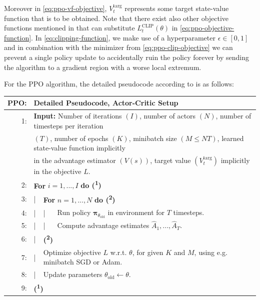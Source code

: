 \noindent Moreover in \eqref{eq:ppo-vf-objective}, $V_{t}^{\text{targ}}$ represents some target state-value function that is to be obtained. Note that there exist also other objective functions mentioned in \cite{ppo-paper} that can substitute $L_{t}^{\text{CLIP}}(\theta)$ in \eqref{eq:ppo-objective-function}. In \eqref{eq:clipping-function}, we make use of a hyperparameter $\epsilon \in [0, 1]$ and in combination with the minimizer from \eqref{eq:ppo-clip-objective} we can prevent a single policy update to accidentally ruin the policy forever by sending the algorithm to a gradient region with a worse local extremum.

\noindent For the PPO algorithm, the detailed pseudocode according to \cite{ppo-paper} is as follows:

\begin{table}[h!]
  \centering
  \begin{tabular}{rlll}
    \hline\hline
    \textbf{PPO:} & \multicolumn{3}{l}{Detailed Pseudocode, Actor-Critic Setup}\\
    \hline
    1: & \multicolumn{3}{l}{\textbf{Input:} Number of iterations $\left(I\right)$, number of actors $\left(N\right)$, number of timesteps per iteration}\\
    & \multicolumn{3}{l}{$\left(T\right)$, number of epochs $(K)$, minibatch size $(M \leq NT)$, learned state-value function implicitly}\\
    & \multicolumn{3}{l}{in the advantage estimator $(V(s))$, target value $(V_{t}^{\text{targ}})$ implicitly in the objective $L$.}\\
    2: & \multicolumn{3}{l}{\textbf{For} $i = 1, ..., I$ \textbf{do (\textsuperscript{1})}}\\
    3: & | & \multicolumn{2}{l}{\textbf{For} $n = 1, ..., N$ \textbf{do (\textsuperscript{2})}}\\
    4: & | & | & Run policy $\boldsymbol{\pi}_{\theta_{\text{old}}}$ in environment for $T$ timesteps.\\
    5: & | & | & Compute advantage estimates $\hat{A}_{1}, ..., \hat{A}_{T}$.\\
    6: & | & \multicolumn{2}{l}{\textbf{(\textsuperscript{2})}}\\
    7: & | & \multicolumn{2}{l}{Optimize objective $L$ w.r.t. $\theta$, for given $K$ and $M$, using e.g. minibatch SGD or Adam.}\\
    8: & | & \multicolumn{2}{l}{Update parameters $\theta_{\text{old}} \leftarrow \theta$.}\\
    9: & \multicolumn{3}{l}{\textbf{(\textsuperscript{1})}}\\
    \hline\hline
  \end{tabular}
\end{table}

